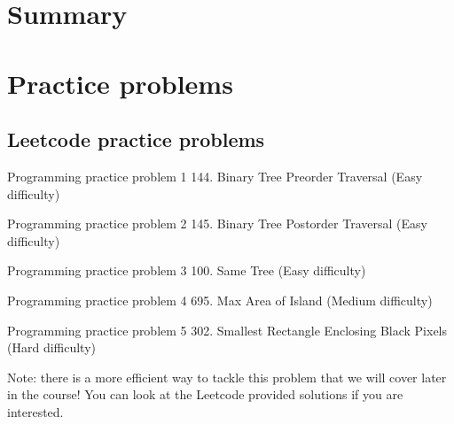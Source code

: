 \documentclass{article}
\begin{document}
\section{Summary}
\begin{summary}
    \vspace{20cm}
\end{summary}

\newpage
\section{Practice problems}
\subsection{Leetcode practice problems}

\begin{problem}{Programming practice problem 1}
    144. Binary Tree Preorder Traversal (Easy difficulty)
\end{problem}

\vspace{7cm}

\begin{problem}{Programming practice problem 2}
    145. Binary Tree Postorder Traversal (Easy difficulty)
\end{problem}



\newpage

\begin{problem}{Programming practice problem 3}
    100. Same Tree (Easy difficulty)
\end{problem}

\vspace{5cm}

\begin{problem}{Programming practice problem 4}
    695. Max Area of Island (Medium difficulty)
\end{problem}


\newpage

\begin{problem}{Programming practice problem 5}
    302. Smallest Rectangle Enclosing Black Pixels (Hard difficulty)
\end{problem}

\vspace{18cm}

\begin{note}
    Note: there is a more efficient way to tackle this problem that we will cover later in the course! You can look at the Leetcode provided solutions if you are interested.
\end{note}
\end{document}
